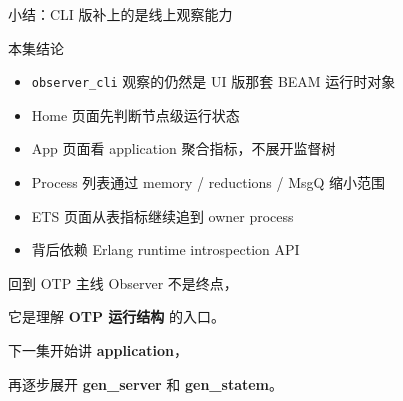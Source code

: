 \documentclass[aspectratio=169, 9pt]{beamer}
\newcommand{\good}[1]{\textbf{\color{accent!80!black}#1}}
\newcommand{\code}[1]{\texttt{#1}}
\begin{document}
\begin{frame}{小结：CLI 版补上的是线上观察能力}
  \begin{block}{本集结论}
    \begin{itemize}
      \item \code{observer\_cli} 观察的仍然是 UI 版那套 BEAM 运行时对象
      \item Home 页面先判断节点级运行状态
      \item App 页面看 application 聚合指标，不展开监督树
      \item Process 列表通过 memory / reductions / MsgQ 缩小范围
      \item ETS 页面从表指标继续追到 owner process
      \item 背后依赖 Erlang runtime introspection API
    \end{itemize}
  \end{block}
  \begin{exampleblock}{回到 OTP 主线}
    \centering
    \Large
    Observer 不是终点，\par
    它是理解 \good{OTP 运行结构} 的入口。\par\vspace{0.2cm}
    下一集开始讲 \good{application}，\par
    再逐步展开 \good{gen\_server} 和 \good{gen\_statem}。
  \end{exampleblock}
\end{frame}
\end{document}
